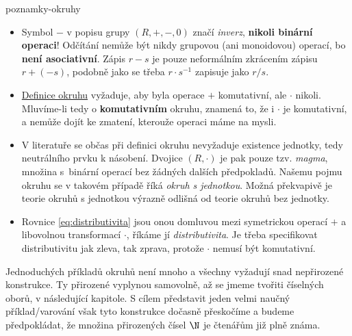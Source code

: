 \begin{remark}{}{poznamky-okruhy}
 \begin{itemize}
  \item Symbol $-$ v popisu grupy $(R,+,-,0)$ značí \emph{inverz},
   \textbf{nikoli binární operaci}! Odčítání nemůže být nikdy grupovou (ani
   monoidovou) operací, bo \textbf{není asociativní}. Zápis $r - s$ je pouze
   neformálním zkrácením zápisu $r + (-s)$, podobně jako se třeba $r \cdot
   s^{-1}$ zapisuje jako $r / s$.
  \item \hyperref[def:okruh]{Definice okruhu} vyžaduje, aby byla operace $+$
   komutativní, ale $ \cdot $ nikoli. Mluvíme-li tedy o \textbf{komutativním}
   okruhu, znamená to, že i $ \cdot $ je komutativní, a nemůže dojít ke zmatení,
   kterouže operaci máme na mysli.
  \item V literatuře se občas při definici okruhu nevyžaduje existence jednotky,
   tedy neutrálního prvku k násobení. Dvojice $(R, \cdot )$ je pak pouze tzv.
   \emph{magma}, množina s~binární operací bez žádných dalších předpokladů.
   Našemu pojmu okruhu se v takovém případě říká \emph{okruh s jednotkou}. Možná
   překvapivě je teorie okruhů s jednotkou výrazně odlišná od teorie okruhů bez
   jednotky.
  \item Rovnice \eqref{eq:distributivita} jsou onou  domluvou mezi
   symetrickou operací $+$ a libovolnou transformací $ \cdot $, říkáme jí
   \emph{distributivita}. Je třeba specifikovat distributivitu jak zleva, tak
   zprava, protože $ \cdot $ nemusí být komutativní.
 \end{itemize}
\end{remark}

Jednoduchých příkladů okruhů není mnoho a všechny vyžadují snad nepřirozené
konstrukce. Ty přirozené vyplynou samovolně, až se jmeme tvořiti číselných
oborů, v následující kapitole. S cílem představit jeden velmi naučný
příklad/varování však tyto konstrukce dočasně přeskočíme a budeme předpokládat,
že množina přirozených čísel $\N$ je čtenářům již plně známa.

